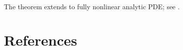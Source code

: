 \begin{remark}
\label{rem:cauchy-kovalevskaya-fully-nonlinear}

The theorem extends to fully nonlinear analytic PDE; see \cite{Folland1976}.
\end{remark}

\section{References}
\label{sec:ch4-references}

\noindent\cite{Pinsky1991,Pinsky1991,Strauss1992,ThoeZachmanoglou1986,Weinberger1965,Olver1986,SteinWeiss1971,Stein1993,Hormander1983,Rauch1992,Treves1975,PinskyTaylor1997,CourantHilbert1962,Hormander1971,BensoussanLionsPapanicolaou1978,Folland1976,John1982,DiBenedetto1995,Mikhailov1978}
